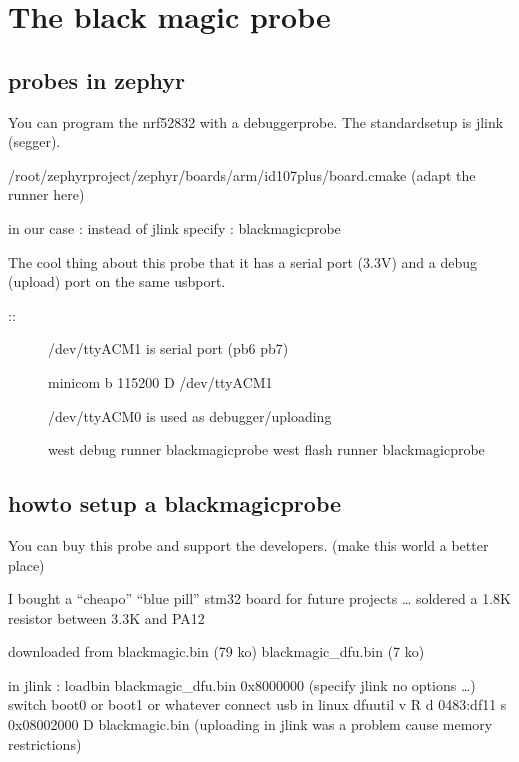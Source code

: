 \documentclass[letterpaper,10pt,english]{sphinxmanual}
\begin{document}
\section{The black magic probe}
\label{\detokenize{debugging/blackmagicprobe:the-black-magic-probe}}\label{\detokenize{debugging/blackmagicprobe::doc}}

\subsection{probes in zephyr}
\label{\detokenize{debugging/blackmagicprobe:probes-in-zephyr}}
You can program the nrf52832 with a debuggerprobe.
The standard\sphinxhyphen{}setup is jlink (segger).

/root/zephyrproject/zephyr/boards/arm/id107plus/board.cmake (adapt the runner here)

in our case : instead of jlink specify : blackmagicprobe

The cool thing about this probe that it has a serial port (3.3V) and a debug (upload) port on the same usb\sphinxhyphen{}port.
\begin{description}
\item[{::}] \leavevmode
/dev/ttyACM1 is serial port (pb6 pb7)

minicom \sphinxhyphen{}b 115200 \sphinxhyphen{}D /dev/ttyACM1

/dev/ttyACM0 is used as debugger/uploading

west debug \textendash{}runner blackmagicprobe
west flash \textendash{}runner blackmagicprobe

\end{description}


\subsection{howto setup a blackmagicprobe}
\label{\detokenize{debugging/blackmagicprobe:howto-setup-a-blackmagicprobe}}
You can buy this probe and support the developers. (make this world a better place)

I bought a “cheapo” “blue pill” stm32 board for future projects …
soldered a 1.8K resistor between 3.3K and PA12

downloaded from 
\sphinxhyphen{} blackmagic.bin (79 ko)
\sphinxhyphen{} blackmagic\_dfu.bin (7 ko)

in jlink : loadbin blackmagic\_dfu.bin 0x8000000 (specify jlink no options …)
switch boot0 or boot1 or whatever
connect usb
in linux
dfu\sphinxhyphen{}util \sphinxhyphen{}v \sphinxhyphen{}R \sphinxhyphen{}d 0483:df11 \sphinxhyphen{}s 0x08002000 \sphinxhyphen{}D blackmagic.bin
(uploading in jlink was a problem cause memory restrictions)
\end{document}
